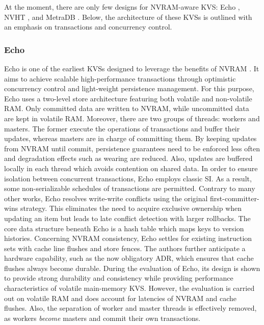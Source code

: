 At the moment, there are only few designs for \ac{NVRAM}-aware \ac{KVS}: Echo
\cite{bailey2013exploring}, NVHT \cite{zhou2016nvht}, and MetraDB
\cite{marmol2016nonvolatile}. Below, the architecture of these \acp{KVS} is
outlined with an emphasis on transactions and concurrency control.

\subsubsection{Echo}

Echo is one of the earliest \acp{KVS} designed to leverage the benefits of
\ac{NVRAM} \cite{bailey2013exploring}. It aims to achieve scalable
high-performance transactions through optimistic concurrency control and
light-weight persistence management. For this purpose, Echo uses a two-level
store architecture featuring both volatile and non-volatile \ac{RAM}. Only
committed data are written to \ac{NVRAM}, while uncommitted data are kept in
volatile \ac{RAM}. Moreover, there are two groups of threads: workers and
masters. The former execute the operations of transactions and buffer their
updates, whereas masters are in charge of committing them. By keeping updates
from \ac{NVRAM} until commit, persistence guarantees need to be enforced less
often and degradation effects such as wearing are reduced. Also, updates are
buffered locally in each thread which avoids contention on shared data. In order
to ensure isolation between concurrent transactions, Echo employs classic
\ac{SI}. As a result, some non-serializable schedules of transactions are
permitted. Contrary to many other works, Echo resolves write-write conflicts
using the original first-committer-wins strategy. This eliminates the need to
acquire exclusive ownership when updating an item but leads to late conflict
detection with larger rollbacks. The core data structure beneath Echo is a hash
table which maps keys to version histories. Concerning \ac{NVRAM} consistency,
Echo settles for existing instruction sets with cache line flushes and store
fences. The authors further anticipate a hardware capability, such as the now
obligatory \ac{ADR}, which ensures that cache flushes always become durable.
During the evaluation of Echo, its design is shown to provide strong durability
and consistency while providing performance characteristics of volatile
main-memory \ac{KVS}. However, the evaluation is carried out on volatile
\ac{RAM} and does account for latencies of \ac{NVRAM} and cache flushes. Also,
the separation of worker and master threads is effectively removed, as workers
\emph{become} masters and commit their own transactions.

